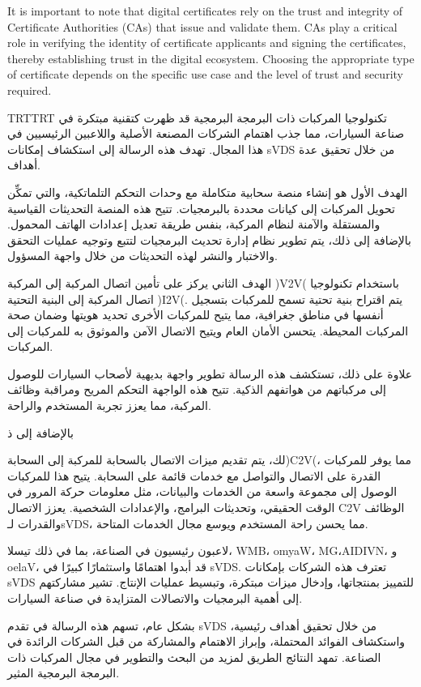 \documentclass[
12pt,
oneside, 
onehalfspacing, 
nolistspacing, 
parskip, 
chapterinoneline, 
]{AASTCOMPUTER}
\newenvironment{Arabic}    
    {\textdir TRT\pardir TRT\arabicfont}{}
\begin{document}
It is important to note that digital certificates rely on the trust and integrity of Certificate Authorities (CAs) that issue and validate them. CAs play a critical role in verifying the identity of certificate applicants and signing the certificates, thereby establishing trust in the digital ecosystem. Choosing the appropriate type of certificate depends on the specific use case and the level of trust and security required.
\begin{arabicabstractp}
\begin{Arabic}
تكنولوجيا المركبات ذات البرمجة البرمجية قد ظهرت كتقنية مبتكرة في صناعة السيارات، مما جذب اهتمام الشركات المصنعة الأصلية واللاعبين الرئيسيين في هذا المجال. تهدف هذه الرسالة إلى استكشاف إمكانات sVDS من خلال تحقيق عدة أهداف.

الهدف الأول هو إنشاء منصة سحابية متكاملة مع وحدات التحكم التلماتكية، والتي تمكِّن تحويل المركبات إلى كيانات محددة بالبرمجيات. تتيح هذه المنصة التحديثات القياسية والمستقلة والآمنة لنظام المركبة، بنفس طريقة تعديل إعدادات الهاتف المحمول. بالإضافة إلى ذلك، يتم تطوير نظام إدارة تحديث البرمجيات لتتبع وتوجيه عمليات التحقق والاختبار والنشر لهذه التحديثات من خلال واجهة المسؤول.

الهدف الثاني يركز على تأمين اتصال المركبة إلى المركبة )V2V( باستخدام تكنولوجيا اتصال المركبة إلى البنية التحتية )I2V(. يتم اقتراح بنية تحتية تسمح للمركبات بتسجيل أنفسها في مناطق جغرافية، مما يتيح للمركبات الأخرى تحديد هويتها وضمان صحة المركبات المحيطة. يتحسن الأمان العام ويتيح الاتصال الآمن والموثوق به للمركبات إلى المركبات.

علاوة على ذلك، تستكشف هذه الرسالة تطوير واجهة بديهية لأصحاب السيارات للوصول إلى مركباتهم من هواتفهم الذكية. تتيح هذه الواجهة التحكم المريح ومراقبة وظائف المركبة، مما يعزز تجربة المستخدم والراحة.

بالإضافة إلى ذ

لك، يتم تقديم ميزات الاتصال بالسحابة للمركبة إلى السحابة)C2V(، مما يوفر للمركبات القدرة على الاتصال والتواصل مع خدمات قائمة على السحابة. يتيح هذا للمركبات الوصول إلى مجموعة واسعة من الخدمات والبيانات، مثل معلومات حركة المرور في الوقت الحقيقي، وتحديثات البرامج، والإعدادات الشخصية. يعزز الاتصال C2V الوظائف والقدرات لـsVDS، مما يحسن راحة المستخدم ويوسع مجال الخدمات المتاحة.

لاعبون رئيسيون في الصناعة، بما في ذلك تيسلا، WMB، omyaW، MG،AIDIVN، و oelaV، قد أبدوا اهتمامًا واستثمارًا كبيرًا في sVDS. تعترف هذه الشركات بإمكانات sVDS للتمييز بمنتجاتها، وإدخال ميزات مبتكرة، وتبسيط عمليات الإنتاج. تشير مشاركتهم إلى أهمية البرمجيات والاتصالات المتزايدة في صناعة السيارات.

بشكل عام، تسهم هذه الرسالة في تقدم sVDS من خلال تحقيق أهداف رئيسية، واستكشاف الفوائد المحتملة، وإبراز الاهتمام والمشاركة من قبل الشركات الرائدة في الصناعة. تمهد النتائج الطريق لمزيد من البحث والتطوير في مجال المركبات ذات البرمجة البرمجية المثير.
\end{Arabic}
\end{arabicabstractp}
\end{document}
